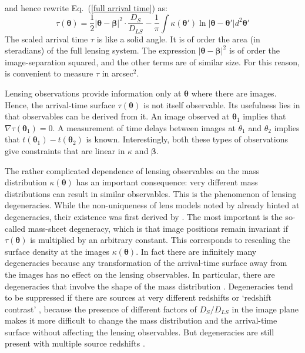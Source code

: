\documentclass[galley,usenatbib]{mn2e}
\renewcommand{\vec}[1]{\ensuremath{\boldsymbol{#1}}}
\newcommand{\eqnref}[1] {Eq.~(\ref{#1})}
\begin{document}
%
and hence rewrite \eqnref{full arrival time} as:
%
\begin{equation}
\tau(\vec\theta) = {\textstyle\frac12} |\vec\theta - \vec\beta|^2
                   \cdot \frac{D_{S}}{D_{LS}}
                 - \frac1\pi \int \kappa (\vec\theta')
                   \ln|\vec\theta - \vec\theta'| d^2\vec\theta'
\label{arrival time2}
\end{equation}
%
The scaled arrival time $\tau$ is like a solid angle. It is of order the area
(in steradians) of the full lensing system. The expression $|\vec\theta -
\vec\beta|^2$ is of order the image-separation squared, and the other terms are
of similar size.  For this reason, is convenient to measure $\tau$ in
arcsec$^{2}$.

Lensing observations provide information only at $\vec\theta$ where there are
images.  Hence, the arrival-time surface $\tau(\vec\theta)$ is not itself
observable.  Its usefulness lies in that observables can be derived from it.
An image observed at $\vec\theta_1$ implies that $\nabla\tau(\vec\theta_1)=0$.
A measurement of time delays between images at $\theta_1$ and $\theta_2$
implies that $t(\vec\theta_1)-t(\vec\theta_2)$ is known.  Interestingly, both
these types of observations give constraints that are linear in $\kappa$ and
$\vec\beta$.

The rather complicated dependence of lensing observables on the mass
distribution $\kappa(\vec\theta)$ has an important consequence: very different
mass distributions can result in similar observables.  This is the phenomenon
of lensing degeneracies.  While the non-uniqueness of lens models noted by
\cite{1981ApJ...244..736Y} already hinted at degeneracies, their existence was
first derived by \cite{1985ApJ...289L...1F}.  The most important is the
so-called mass-sheet degeneracy, which is that image positions remain invariant
if $\tau(\vec\theta)$ is multiplied by an arbitrary constant.  
This corresponds to rescaling the surface density at the images
$\kappa(\vec\theta)$. In fact there are infinitely many degeneracies
\citep{2000AJ....120.1654S} because any transformation of the arrival-time
surface away from the images has no effect on the lensing observables.  In
particular, there are degeneracies that involve the shape of the mass
distribution \citep{2006ApJ...653..936S,2013arXiv1306.4675S}.  Degeneracies
tend to be suppressed if there are sources at very different redshifts or
`redshift contrast' \citep{1998AJ....116.1541A,2009ApJ...690..154S}, because
the presence of different factors of $D_S/D_{LS}$ in the image plane makes it
more difficult to change the mass distribution and the arrival-time surface
without affecting the lensing observables. But degeneracies are still present
with multiple source redshifts \citep{2008MNRAS.386..307L,2014arXiv1406.6152S}.
\end{document}
